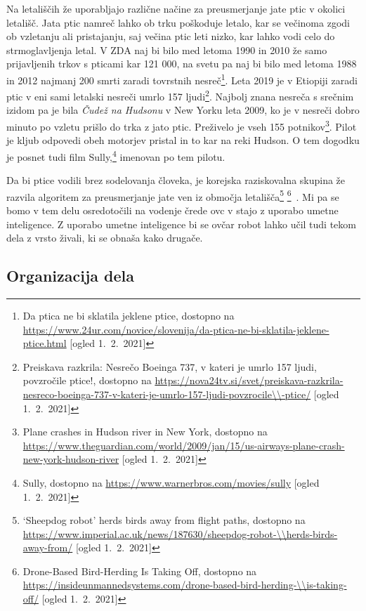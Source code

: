 Na letališčih že uporabljajo različne načine za preusmerjanje jate ptic v okolici letališč. Jata ptic namreč lahko ob trku poškoduje letalo, kar se večinoma zgodi ob vzletanju ali pristajanju, saj večina ptic leti nizko, kar lahko vodi celo do strmoglavljenja letal. V ZDA naj bi bilo med letoma 1990 in 2010 že samo prijavljenih trkov s pticami kar 121 000, na svetu pa naj bi bilo med letoma 1988 in 2012 najmanj 200 smrti zaradi tovrstnih nesreč\footnote{Da ptica ne bi sklatila jeklene ptice, dostopno na \url{https://www.24ur.com/novice/slovenija/da-ptica-ne-bi-sklatila-jeklene-ptice.html} [ogled 1.\ 2.\ 2021]}. Leta 2019 je v Etiopiji zaradi ptic v eni sami letalski nesreči umrlo 157 ljudi\footnote{Preiskava razkrila: Nesrečo Boeinga 737, v kateri je umrlo 157 ljudi, povzročile ptice!, dostopno na \url{https://nova24tv.si/svet/preiskava-razkrila-nesreco-boeinga-737-v-kateri-je-umrlo-157-ljudi-povzrocile\\-ptice/} [ogled 1.\ 2.\ 2021]}. Najbolj znana nesreča s srečnim izidom pa je bila \textit{Čudež na Hudsonu} v New Yorku leta 2009, ko je v nesreči dobro minuto po vzletu prišlo do trka z jato ptic. Preživelo je vseh 155 potnikov\footnote{Plane crashes in Hudson river in New York, dostopno na \url{https://www.theguardian.com/world/2009/jan/15/us-airways-plane-crash-new-york-hudson-river} [ogled 1.\ 2.\ 2021]}. Pilot je kljub odpovedi obeh motorjev pristal in to kar na reki Hudson. O tem dogodku je posnet tudi film Sully,\footnote{Sully, dostopno na \url{https://www.warnerbros.com/movies/sully} [ogled 1.\ 2.\ 2021]} imenovan po tem pilotu.

Da bi ptice vodili brez sodelovanja človeka, je korejska raziskovalna skupina že razvila algoritem za preusmerjanje jate ven iz območja letališča\footnote{‘Sheepdog robot’ herds birds away from flight paths, dostopno na \url{https://www.imperial.ac.uk/news/187630/sheepdog-robot-\\herds-birds-away-from/} [ogled 1.\ 2.\ 2021]} \footnote{Drone-Based Bird-Herding Is Taking Off, dostopno na \url{https://insideunmannedsystems.com/drone-based-bird-herding-\\is-taking-off/} [ogled 1.\ 2.\ 2021]}~\cite{bird-herd}. Mi pa se bomo v tem delu osredotočili na vodenje črede ovc v stajo z uporabo umetne inteligence. Z uporabo umetne inteligence bi se ovčar robot lahko učil tudi tekom dela z vrsto živali, ki se obnaša kako drugače.

\subsection{Organizacija dela}

